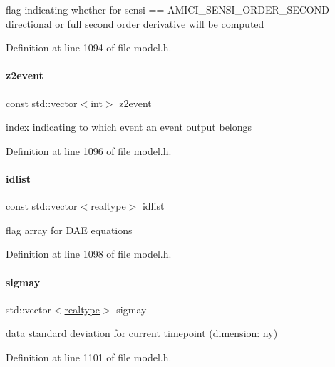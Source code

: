 flag indicating whether for sensi == A\+M\+I\+C\+I\+\_\+\+S\+E\+N\+S\+I\+\_\+\+O\+R\+D\+E\+R\+\_\+\+S\+E\+C\+O\+ND directional or full second order derivative will be computed 

Definition at line 1094 of file model.\+h.

\mbox{\label{classamici_1_1_model_af3343032542edf755502ca03f125a3e4}} 
\paragraph{\texorpdfstring{z2event}{z2event}}
{\footnotesize\ttfamily const std\+::vector$<$int$>$ z2event}

index indicating to which event an event output belongs 

Definition at line 1096 of file model.\+h.

\mbox{\label{classamici_1_1_model_a3eadbed11a3c95f9d046633151414420}} 
\paragraph{\texorpdfstring{idlist}{idlist}}
{\footnotesize\ttfamily const std\+::vector$<$\mbox{\hyperlink{namespaceamici_a1bdce28051d6a53868f7ccbf5f2c14a3}{realtype}}$>$ idlist}

flag array for D\+AE equations 

Definition at line 1098 of file model.\+h.

\mbox{\label{classamici_1_1_model_a7dc280c0479f4a1fffe67fea251c26d2}} 
\paragraph{\texorpdfstring{sigmay}{sigmay}}
{\footnotesize\ttfamily std\+::vector$<$\mbox{\hyperlink{namespaceamici_a1bdce28051d6a53868f7ccbf5f2c14a3}{realtype}}$>$ sigmay}

data standard deviation for current timepoint (dimension\+: ny) 

Definition at line 1101 of file model.\+h.

